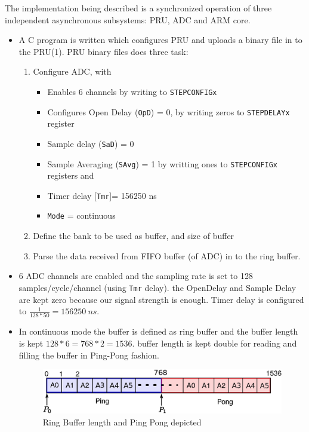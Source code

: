 The implementation being described is a synchronized operation of three independent asynchronous subsystems: PRU, ADC and ARM core.
\begin{itemize}
	\item A C program is written which configures PRU and uploads a binary file in to the PRU(1). PRU binary files does three task:
	\begin{enumerate}
		\item Configure ADC, with 
		\begin{itemize}
			\item Enables 6 channels by writing to \texttt{STEPCONFIGx}
			\item Configures Open Delay (\texttt{OpD}) = 0, by writing zeros to \texttt{STEPDELAYx} register  
			\item Sample delay (\texttt{SaD}) = 0 
			\item Sample Averaging (\texttt{SAvg}) = 1  by writting ones to  \texttt{STEPCONFIGx} registers and 
			\item Timer delay [\texttt{Tmr}]= 156250 ns
			\item \texttt{Mode} = continuous 
		\end{itemize}
		\item Define the bank to be used as buffer, and size of buffer
		\item Parse the data received from FIFO buffer (of ADC) in to the ring buffer. 
	\end{enumerate}
	\item 6 ADC channels are enabled and the sampling rate is set to 128 samples/cycle/channel (using \texttt{Tmr} delay). the OpenDelay and Sample Delay are kept zero because our signal strength is enough. Timer delay is configured to $ \frac{1}{128 * 50} = 156250 ~ns $.
	\item In continuous mode the buffer is defined as ring buffer and the   buffer length is kept $ 128 * 6 = 768 * 2 = 1536 $. buffer length is kept double for reading and filling the buffer in Ping-Pong fashion.  
	\begin{figure}[h]
		\includegraphics[width=\textwidth]{fig/ring_buffer.eps}
		\caption{Ring Buffer length and Ping Pong depicted}
		\label{fig:rb_pp}
	\end{figure}

\end{itemize}
